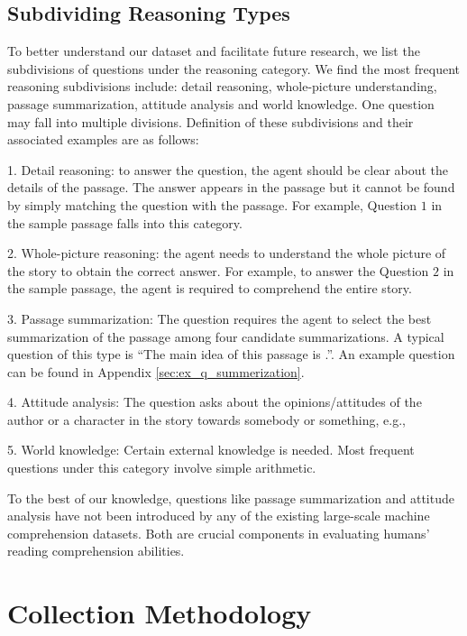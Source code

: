 \subsection{Subdividing Reasoning Types}
\label{sec:sub_reason}

To better understand our dataset and facilitate future research, we list the subdivisions of questions under the reasoning category. We find the most frequent reasoning subdivisions include: detail reasoning, whole-picture understanding, passage summarization, attitude analysis and world knowledge.  One question may fall into multiple divisions. Definition of these subdivisions and their associated examples are as follows:

1. Detail reasoning: to answer the question, the agent should be clear about the details of the passage. The answer appears in the passage but it cannot be found by simply matching the question with the passage. For example, Question $1$ in the sample passage falls into this category.

2. Whole-picture reasoning: the agent needs to understand the whole picture of the story to obtain the correct answer. For example, to answer the Question $2$ in the sample passage, the agent is required to comprehend the entire story.  

3. Passage summarization: The question requires the agent to select the best summarization of the passage among four candidate summarizations. A typical question of this type is ``The main idea of this passage is \underline{}.''.
An example question can be found in Appendix \ref{sec:ex_q_summerization}.

4. Attitude analysis: The question asks about the opinions/attitudes of the author or a character in the story towards somebody or something, e.g.,

\begin{framed}

\end{framed}

5. World knowledge: Certain external knowledge is needed. Most frequent questions under this category involve simple arithmetic.

To the best of our knowledge, questions like passage summarization and attitude analysis have not been introduced by any of the existing large-scale machine comprehension datasets. Both are crucial components in evaluating humans' reading comprehension abilities.

\section{Collection Methodology}
\label{sec:collection}

